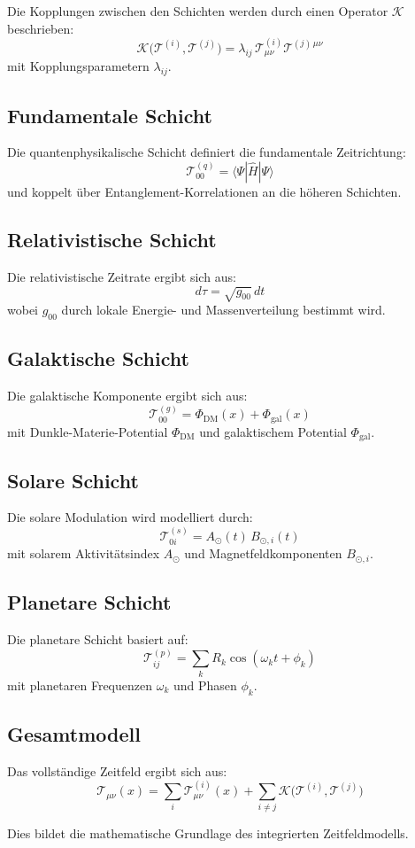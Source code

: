 Die Kopplungen zwischen den Schichten werden durch einen Operator $\mathcal{K}$ beschrieben:
\[
\mathcal{K}\big(\mathcal{T}^{(i)}, \mathcal{T}^{(j)}\big)
= \lambda_{ij} \, \mathcal{T}^{(i)}_{\mu\nu} \mathcal{T}^{(j)\,\mu\nu}
\]
mit Kopplungsparametern $\lambda_{ij}$.

\subsection{Fundamentale Schicht}

Die quantenphysikalische Schicht definiert die fundamentale Zeitrichtung:
\[
\mathcal{T}^{(q)}_{00} = \langle \Psi | \hat{H} | \Psi \rangle
\]
und koppelt über Entanglement-Korrelationen an die höheren Schichten.

\subsection{Relativistische Schicht}

Die relativistische Zeitrate ergibt sich aus:
\[
d\tau = \sqrt{g_{00}} \, dt
\]
wobei $g_{00}$ durch lokale Energie- und Massenverteilung bestimmt wird.

\subsection{Galaktische Schicht}

Die galaktische Komponente ergibt sich aus:
\[
\mathcal{T}^{(g)}_{00} = \Phi_{\text{DM}}(x) + \Phi_{\text{gal}}(x)
\]
mit Dunkle-Materie-Potential $\Phi_{\text{DM}}$ und galaktischem Potential $\Phi_{\text{gal}}$.

\subsection{Solare Schicht}

Die solare Modulation wird modelliert durch:
\[
\mathcal{T}^{(s)}_{0i} = A_{\odot}(t) \, B_{\odot,i}(t)
\]
mit solarem Aktivitätsindex $A_{\odot}$ und Magnetfeldkomponenten $B_{\odot,i}$.

\subsection{Planetare Schicht}

Die planetare Schicht basiert auf:
\[
\mathcal{T}^{(p)}_{ij} = \sum_k R_k \cos(\omega_k t + \phi_k)
\]
mit planetaren Frequenzen $\omega_k$ und Phasen $\phi_k$.

\subsection{Gesamtmodell}

Das vollständige Zeitfeld ergibt sich aus:
\[
\boxed{
\mathcal{T}_{\mu\nu}(x) =
\sum_{i} \mathcal{T}^{(i)}_{\mu\nu}(x)
+
\sum_{i \neq j} \mathcal{K}\big(\mathcal{T}^{(i)}, \mathcal{T}^{(j)}\big)
}
\]

Dies bildet die mathematische Grundlage des integrierten Zeitfeldmodells.

